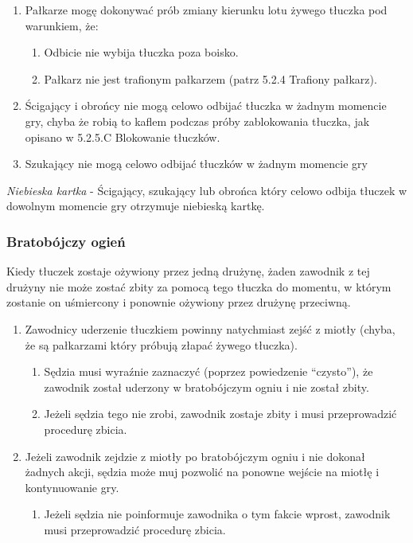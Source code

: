 \documentclass[12pt]{article}
\begin{document}
\begin{enumerate}
	\item
	      Pałkarze mogę dokonywać prób zmiany kierunku lotu żywego tłuczka pod
	      warunkiem, że:

	      \begin{enumerate}
		      \item
		            Odbicie nie wybija tłuczka poza boisko.
		      \item
		            Pałkarz nie jest trafionym pałkarzem (patrz 5.2.4 Trafiony pałkarz).
	      \end{enumerate}
	\item
	      Ścigający i obrońcy nie mogą celowo odbijać tłuczka w żadnym momencie
	      gry, chyba że robią to kaflem podczas próby zablokowania tłuczka, jak
	      opisano w 5.2.5.C Blokowanie tłuczków.
	\item
	      Szukający nie mogą celowo odbijać tłuczków w żadnym momencie gry
\end{enumerate}

\emph{Niebieska kartka} - Ścigający, szukający lub obrońca który celowo
odbija tłuczek w dowolnym momencie gry otrzymuje niebieską kartkę.

\subsubsection{Bratobójczy ogień}

Kiedy tłuczek zostaje ożywiony przez jedną drużynę, żaden zawodnik z tej
drużyny nie może zostać zbity za pomocą tego tłuczka do momentu, w
którym zostanie on uśmiercony i ponownie ożywiony przez drużynę
przeciwną.

\begin{enumerate}
	\item
	      Zawodnicy uderzenie tłuczkiem powinny natychmiast zejść z miotły
	      (chyba, że są pałkarzami który próbują złapać żywego tłuczka).

	      \begin{enumerate}
		      \item
		            Sędzia musi wyraźnie zaznaczyć (poprzez powiedzenie ``czysto''), że
		            zawodnik został uderzony w bratobójczym ogniu i nie został zbity.
		      \item
		            Jeżeli sędzia tego nie zrobi, zawodnik zostaje zbity i musi
		            przeprowadzić procedurę zbicia.
	      \end{enumerate}
	\item
	      Jeżeli zawodnik zejdzie z miotły po bratobójczym ogniu i nie dokonał
	      żadnych akcji, sędzia może muj pozwolić na ponowne wejście na miotłę i
	      kontynuowanie gry.

	      \begin{enumerate}
		      \item
		            Jeżeli sędzia nie poinformuje zawodnika o tym fakcie wprost,
		            zawodnik musi przeprowadzić procedurę zbicia.
	      \end{enumerate}
\end{enumerate}
\end{document}
